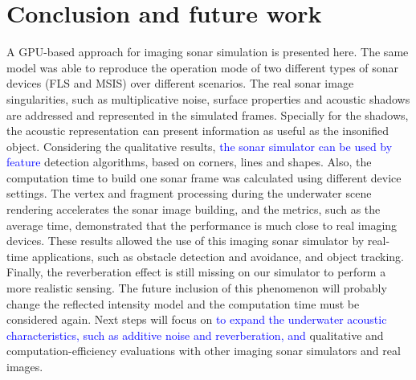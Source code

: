 \documentclass[final,5p,times]{elsarticle}
\begin{document}

\section{Conclusion and future work}
\label{conclusion}

A GPU-based approach for imaging sonar simulation is presented here.
The same model was able to reproduce the operation mode of two different
types of sonar devices (FLS and MSIS) over different scenarios. The real
sonar image singularities, such as multiplicative noise, surface
properties and acoustic shadows are addressed and represented in the
simulated frames. Specially for the shadows, the acoustic representation
can present information as useful as the insonified object. Considering
the qualitative results, \textcolor{blue}{the sonar simulator can be used by feature} detection
algorithms, based on corners, lines and shapes. Also, the computation time
to build one sonar frame was calculated using different device settings.
The vertex and fragment processing during the underwater scene rendering
accelerates the sonar image building, and the metrics, such as the average
time, demonstrated that the performance is much close to real imaging
devices. These results allowed the use of this imaging sonar simulator
by real-time applications, such as obstacle detection and avoidance, and
object tracking. Finally, the reverberation effect is still missing on
our simulator to perform a more realistic sensing. The future inclusion
of this phenomenon will probably change the reflected intensity model
and the computation time must be considered again. Next steps will
focus on \textcolor{blue}{to expand the underwater acoustic characteristics, such as additive
noise and reverberation, and} qualitative and computation\hyp{}efficiency
evaluations with other imaging sonar simulators and real images.








\end{document}
